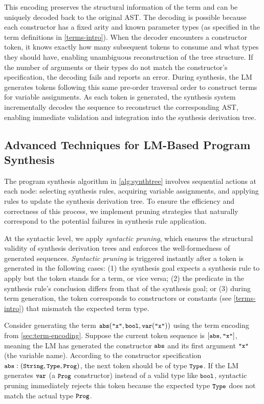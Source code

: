 This encoding preserves the structural information of the term and can be uniquely decoded back to the original AST. The decoding is possible because each constructor has a fixed arity and known parameter types (as specified in the term definitions in \autoref{terms-intro}). When the decoder encounters a constructor token, it knows exactly how many subsequent tokens to consume and what types they should have, enabling unambiguous reconstruction of the tree structure. If the number of arguments or their types do not match the constructor's specification, the decoding fails and reports an error. During synthesis, the LM generates tokens following this same pre-order traversal order to construct terms for variable assignments. As each token is generated, the synthesis system incrementally decodes the sequence to reconstruct the corresponding AST, enabling immediate validation and integration into the synthesis derivation tree.

\subsection{Advanced Techniques for LM-Based Program Synthesis}
The program synthesis algorithm in \autoref{alg:synthtree} involves sequential actions at each node: selecting synthesis rules, acquiring variable assignments, and applying rules to update the synthesis derivation tree. 
%
To ensure the efficiency and correctness of this process, we implement pruning strategies that naturally correspond to the potential failures in synthesis rule application. 

At the syntactic level, we apply \emph{syntactic pruning}, which ensures the structural validity of synthesis derivation trees and enforces the well-formedness of generated sequences.
\emph{Syntactic pruning} is triggered instantly after a token is generated in the following cases: (1) the synthesis goal expects a synthesis rule to apply but the token stands for a term, or vice versa; (2) the predicate in the synthesis rule's conclusion differs from that of the synthesis goal; or (3) during term generation, the token corresponds to constructors or constants (see \autoref{terms-intro}) that mismatch the expected term type.
%
\begin{example}
Consider generating the term $\tcode{abs}(\tcode{"x"}, \tcode{bool}, \tcode{var}(\tcode{"x"}))$ using the term encoding from \autoref{sec:term-encoding}. Suppose the current token sequence is $[\tcode{abs}, \tcode{"x"}]$, meaning the LM has generated the constructor $\tcode{abs}$ and its first argument $\tcode{"x"}$ (the variable name). According to the constructor specification $\tcode{abs} : (\tcode{String}, \tcode{Type}, \tcode{Prog})$, the next token should be of type $\tcode{Type}$. If the LM generates $\tcode{var}$ (a $\tcode{Prog}$ constructor) instead of a valid type like $\tcode{bool}$, syntactic pruning immediately rejects this token because the expected type $\tcode{Type}$ does not match the actual type $\tcode{Prog}$.
\end{example}

